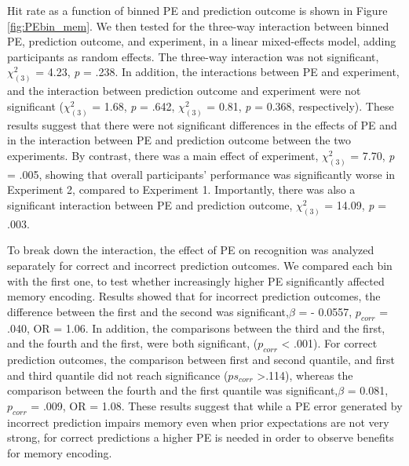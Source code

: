 \documentclass[a4paper,12pt]{article}
\begin{document}
Hit rate as a function of binned PE and prediction outcome is shown in Figure \ref{fig:PEbin_mem}. 
 We then tested for the three-way interaction between binned PE, prediction outcome, and experiment, in a linear mixed-effects model, adding participants as random effects. The three-way interaction was not significant, $\chi^2_{(3)}$ = 4.23, \textit{p} = .238. In addition, the interactions between PE and experiment, and the interaction between prediction outcome and experiment were not significant ($\chi^2_{(3)}$ = 1.68, \textit{p} = .642, $\chi^2_{(3)}$ = 0.81, \textit{p} = 0.368, respectively). These results suggest that there were not significant differences in the effects of PE and in the interaction between PE and prediction outcome between the two experiments. By contrast, there was a main effect of experiment, $\chi^2_{(3)}$ = 7.70,  \textit{p} = .005,  showing that overall participants’ performance was significantly worse in Experiment 2, compared to Experiment 1. Importantly, there was also a significant interaction between PE and prediction outcome, $\chi^2_{(3)}$ = 14.09, \textit{p} = .003.\par
 To break down the interaction, the effect of PE on recognition was analyzed separately for correct and incorrect prediction outcomes. We compared each bin with the first one, to test whether increasingly higher PE significantly affected memory encoding. Results showed that for incorrect prediction outcomes, the difference between the first and the second was significant,$\beta$ = - 0.0557, $p_{corr}$ = .040, OR = 1.06. In addition, the comparisons between the third and the first, and the fourth and the first, were both significant, ($p_{corr}$ < .001). For correct prediction outcomes, the comparison between first and second quantile, and first and third quantile did not reach significance ($ps_{corr}$  >.114), whereas the comparison between the fourth and the first quantile was significant,$\beta$ = 0.081, $p_{corr}$ = .009, OR = 1.08. These results suggest that while a PE error generated by incorrect prediction impairs memory even when prior expectations are not very strong, for correct predictions a higher PE is needed in order to observe benefits for memory encoding. 
\end{document}
